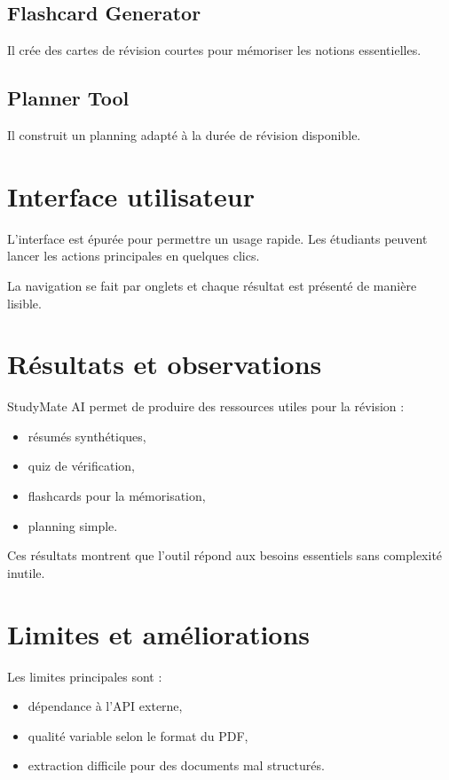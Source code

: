 ﻿\documentclass[12pt,a4paper]{report}
\begin{document}
\section{Flashcard Generator}
Il crée des cartes de révision courtes pour mémoriser les notions essentielles.

\section{Planner Tool}
Il construit un planning adapté à la durée de révision disponible.

\chapter{Interface utilisateur}
L'interface est épurée pour permettre un usage rapide. Les étudiants peuvent lancer les actions principales en quelques clics.

La navigation se fait par onglets et chaque résultat est présenté de manière lisible.

\chapter{Résultats et observations}
StudyMate AI permet de produire des ressources utiles pour la révision :
\begin{itemize}
    \item résumés synthétiques,
    \item quiz de vérification,
    \item flashcards pour la mémorisation,
    \item planning simple.
\end{itemize}

Ces résultats montrent que l'outil répond aux besoins essentiels sans complexité inutile.

\chapter{Limites et améliorations}
Les limites principales sont :
\begin{itemize}
    \item dépendance à l'API externe,
    \item qualité variable selon le format du PDF,
    \item extraction difficile pour des documents mal structurés.
\end{itemize}
\end{document}
